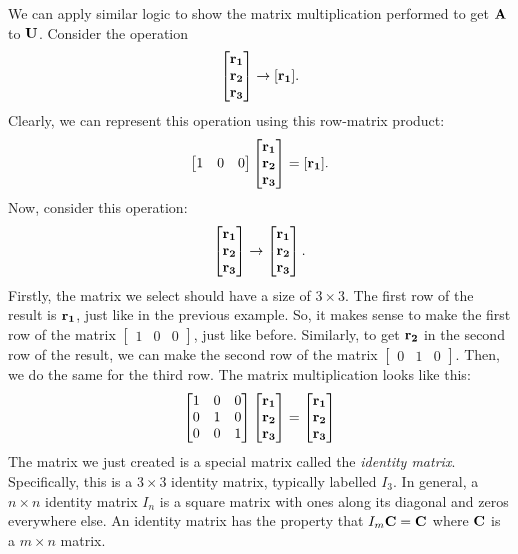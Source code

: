 \documentclass[../main.tex]{subfiles}
\begin{document}
\begin{solution}
	We can apply similar logic to show the matrix multiplication performed
	to get $\mathbf{A}$ to $\mathbf{U}$. Consider
	the operation
	\[\begin{bmatrix}\mathbf{r_1}\\\mathbf{r_2}\\\mathbf{r_3}\end{bmatrix}
		\to[\mathbf{r_1}].\]
	Clearly, we can represent this operation using this row-matrix product:
	\[\begin{bmatrix}1&0&0\end{bmatrix}\begin{bmatrix}\mathbf{r_1}\\\mathbf{r_2}\\\mathbf{r_3}\end{bmatrix}=[\mathbf{r_1}].\]
	Now, consider this operation:
	\[\begin{bmatrix}\mathbf{r_1}\\\mathbf{r_2}\\\mathbf{r_3}\end{bmatrix}\to\begin{bmatrix}\mathbf{r_1}\\\mathbf{r_2}\\\mathbf{r_3}\end{bmatrix}.\]
	Firstly, the matrix we select should have a size of $3\times 3$. The first row of the result
	is $\mathbf{r_1}$, just like in the previous example. So, it makes sense to make the first row
	of the matrix $\begin{bmatrix}1&0&0\end{bmatrix}$, just like before. Similarly, to get
	$\mathbf{r_2}$ in the second row of the result, we can make the second row
	of the matrix $\begin{bmatrix}0&1&0\end{bmatrix}$. Then, we do the same for
	the third row. The matrix multiplication looks like this:
	\[\begin{bmatrix}1&0&0\\0&1&0\\0&0&1\end{bmatrix}\begin{bmatrix}\mathbf{r_1}\\\mathbf{r_2}\\\mathbf{r_3}\end{bmatrix}=\begin{bmatrix}\mathbf{r_1}\\\mathbf{r_2}\\\mathbf{r_3}\end{bmatrix}\]
	The matrix we just created is a special matrix called the \textit{identity matrix}. Specifically,
	this is a $3\times 3$ identity matrix, typically labelled $I_3$. In general, a $n\times n$ identity matrix
	$I_n$ is a square matrix with ones along its diagonal and zeros everywhere else. An identity matrix
	has the property that $I_m\mathbf{C}=\mathbf{C}$ where $\mathbf{C}$ is a $m\times n$ matrix.


\end{solution}
\end{document}
